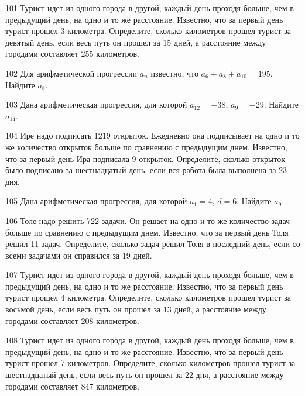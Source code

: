 \documentclass[4apaper]{article}
\begin{document}
\begin{taskBN}{101}
Турист идет из одного города в другой, каждый день проходя больше, чем в предыдущий день, на одно и то же расстояние. Известно, что за первый день турист прошел 3 километра. Определите, сколько километров прошел турист за девятый день, если весь путь он прошел за 15 дней, а расстояние между городами составляет 255 километров.
\end{taskBN}

\begin{taskBN}{102}
Для арифметической прогрессии ${a_n}$ известно, что $a_{6} + a_{8} + a_{10}= 195$. Найдите $a_{8}$.
\end{taskBN}

\begin{taskBN}{103}
Дана арифметическая прогрессия, для которой $a_{12} = -38$, $a_{9} = -29$. Найдите $a_{14}$.
\end{taskBN}

\begin{taskBN}{104}
Ире надо подписать 1219 открыток. Ежедневно она подписывает на одно и то же количество открыток больше по сравнению с предыдущим днем. Известно, что за первый день Ира подписала 9 открыток. Определите, сколько открыток было подписано за шестнадцатый день, если вся работа была выполнена за 23 дня.
\end{taskBN}

\begin{taskBN}{105}
Дана арифметическая прогрессия, для которой $a_1 = 4$, $d=6$. Найдите $a_{9}$.
\end{taskBN}

\begin{taskBN}{106}
Толе надо решить 722 задачи. Он решает на одно и то же количество задач больше по сравнению с предыдущим днем. Известно, что за первый день Толя решил 11 задач. Определите, сколько задач решил Толя в последний день, если со всеми задачами он справился за 19 дней.
\end{taskBN}

\begin{taskBN}{107}
Турист идет из одного города в другой, каждый день проходя больше, чем в предыдущий день, на одно и то же расстояние. Известно, что за первый день турист прошел 4 километра. Определите, сколько километров прошел турист за восьмой день, если весь путь он прошел за 13 дней, а расстояние между городами составляет 208 километров.
\end{taskBN}

\begin{taskBN}{108}
Турист идет из одного города в другой, каждый день проходя больше, чем в предыдущий день, на одно и то же расстояние. Известно, что за первый день турист прошел 7 километров. Определите, сколько километров прошел турист за шестнадцатый день, если весь путь он прошел за 22 дня, а расстояние между городами составляет 847 километров.
\end{taskBN}
\end{document}
